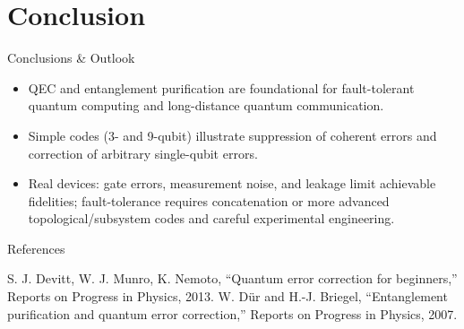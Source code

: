 \documentclass[10pt]{beamer}
\begin{document}
\section{Conclusion}
\begin{frame}{Conclusions \& Outlook}
  \begin{itemize}
    \item QEC and entanglement purification are foundational for fault-tolerant quantum computing and long-distance quantum communication.
    \item Simple codes (3- and 9-qubit) illustrate suppression of coherent errors and correction of arbitrary single-qubit errors.
    \item Real devices: gate errors, measurement noise, and leakage limit achievable fidelities; fault-tolerance requires concatenation or more advanced topological/subsystem codes and careful experimental engineering.
  \end{itemize}
\end{frame}

\begin{frame}[allowframebreaks]{References}
  \begin{thebibliography}{9}
      S. J. Devitt, W. J. Munro, K. Nemoto, ``Quantum error correction for beginners,'' Reports on Progress in Physics, 2013.
      W. D\"ur and H.-J. Briegel, ``Entanglement purification and quantum error correction,'' Reports on Progress in Physics, 2007.
  \end{thebibliography}
\end{frame}
\end{document}

